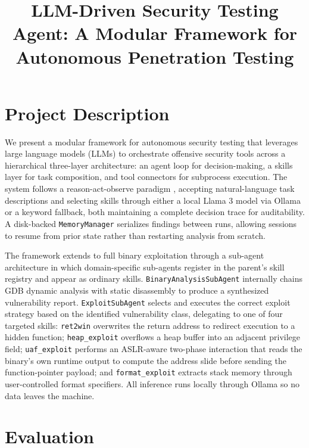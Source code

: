 \documentclass[conference]{IEEEtran}
\begin{document}
\title{LLM-Driven Security Testing Agent: A Modular Framework for Autonomous Penetration Testing}

\author{
}

\maketitle

\section{Project Description}

We present a modular framework for autonomous security testing that leverages large language models (LLMs) to orchestrate offensive security tools across a hierarchical three-layer architecture: an agent loop for decision-making, a skills layer for task composition, and tool connectors for subprocess execution. The system follows a reason-act-observe paradigm \cite{react}, accepting natural-language task descriptions and selecting skills through either a local Llama 3 model via Ollama or a keyword fallback, both maintaining a complete decision trace for auditability. A disk-backed \texttt{MemoryManager} serializes findings between runs, allowing sessions to resume from prior state rather than restarting analysis from scratch.

The framework extends to full binary exploitation through a sub-agent architecture in which domain-specific sub-agents register in the parent's skill registry and appear as ordinary skills. \texttt{BinaryAnalysisSubAgent} internally chains GDB dynamic analysis with static disassembly to produce a synthesized vulnerability report. \texttt{ExploitSubAgent} selects and executes the correct exploit strategy based on the identified vulnerability class, delegating to one of four targeted skills: \texttt{ret2win} overwrites the return address to redirect execution to a hidden function; \texttt{heap\_exploit} overflows a heap buffer into an adjacent privilege field; \texttt{uaf\_exploit} performs an ASLR-aware two-phase interaction that reads the binary's own runtime output to compute the address slide before sending the function-pointer payload; and \texttt{format\_exploit} extracts stack memory through user-controlled format specifiers. All inference runs locally through Ollama so no data leaves the machine.

\section{Evaluation}
\end{document}
